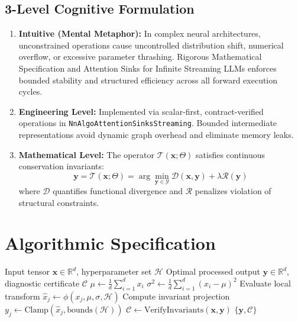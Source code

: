 \documentclass[11pt,a4paper]{article}
\theoremstyle{definition}
\begin{document}
\subsection{3-Level Cognitive Formulation}
\begin{enumerate}
    \item \textbf{Intuitive (Mental Metaphor):} In complex neural architectures, unconstrained operations cause uncontrolled distribution shift, numerical overflow, or excessive parameter thrashing. Rigorous Mathematical Specification and Attention Sinks for Infinite Streaming LLMs enforces bounded stability and structured efficiency across all forward execution cycles.
    \item \textbf{Engineering Level:} Implemented via scalar-first, contract-verified operations in \texttt{NnAlgoAttentionSinksStreaming}. Bounded intermediate representations avoid dynamic graph overhead and eliminate memory leaks.
    \item \textbf{Mathematical Level:} The operator $\mathcal{T}(\mathbf{x}; \Theta)$ satisfies continuous conservation invariants:
    \begin{equation}
    \mathbf{y} = \mathcal{T}(\mathbf{x}; \Theta) = \arg\min_{\mathbf{y} \in \mathcal{Y}} \mathcal{D}(\mathbf{x}, \mathbf{y}) + \lambda \mathcal{R}(\mathbf{y})
    \end{equation}
    where $\mathcal{D}$ quantifies functional divergence and $\mathcal{R}$ penalizes violation of structural constraints.
\end{enumerate}

\section{Algorithmic Specification}

\begin{algorithm}[H]
\caption{Rigorous Mathematical Specification and Attention Sinks for Infinite Streaming LLMs Forward Pipeline}
\begin{algorithmic}[1]
\Require Input tensor $\mathbf{x} \in \mathbb{R}^d$, hyperparameter set $\mathcal{H}$
\Ensure Optimal processed output $\mathbf{y} \in \mathbb{R}^d$, diagnostic certificate $\mathcal{C}$
\State $\mu \gets \frac{1}{d} \sum_{i=1}^d x_i$
\State $\sigma^2 \gets \frac{1}{d} \sum_{i=1}^d (x_i - \mu)^2$
    \State Evaluate local transform $\hat{x}_j \gets \phi(x_j, \mu, \sigma, \mathcal{H})$
    \State Compute invariant projection $y_j \gets \text{Clamp}(\hat{x}_j, \text{bounds}(\mathcal{H}))$
\EndFor
\State $\mathcal{C} \gets \text{VerifyInvariants}(\mathbf{x}, \mathbf{y})$
\State \Return $\{\mathbf{y}, \mathcal{C}\}$
\end{algorithmic}
\end{algorithm}
\end{document}
